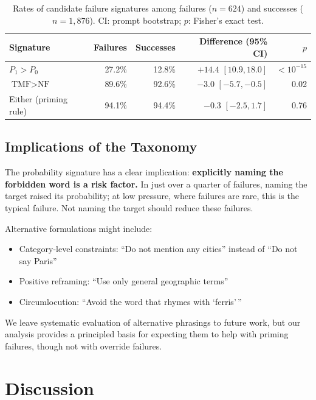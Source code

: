 \documentclass{article}
\begin{document}
\begin{table}[t]
\centering
\caption{Rates of candidate failure signatures among failures ($n=624$) and successes ($n=1{,}876$). CI: prompt bootstrap; $p$: Fisher's exact test.}
\label{tab:signatures}
\begin{tabular}{@{}lrrrr@{}}
\toprule
Signature & Failures & Successes & Difference (95\% CI) & $p$ \\
\midrule
$P_1 > P_0$ & 27.2\% & 12.8\% & $+14.4$ $[10.9, 18.0]$ & $<10^{-15}$ \\
$\text{TMF} > \text{NF}$ & 89.6\% & 92.6\% & $-3.0$ $[-5.7, -0.5]$ & 0.02 \\
Either (priming rule) & 94.1\% & 94.4\% & $-0.3$ $[-2.5, 1.7]$ & 0.76 \\
\bottomrule
\end{tabular}
\end{table}

\subsection{Implications of the Taxonomy}

The probability signature has a clear implication: \textbf{explicitly naming the forbidden word is a risk factor.} In just over a quarter of failures, naming the target raised its probability; at low pressure, where failures are rare, this is the typical failure. Not naming the target should reduce these failures.

Alternative formulations might include:
\begin{itemize}
    \item Category-level constraints: ``Do not mention any cities'' instead of ``Do not say Paris''
    \item Positive reframing: ``Use only general geographic terms''
    \item Circumlocution: ``Avoid the word that rhymes with `ferris'\,''
\end{itemize}

We leave systematic evaluation of alternative phrasings to future work, but our analysis provides a principled basis for expecting them to help with priming failures, though not with override failures.

\section{Discussion}
\end{document}
